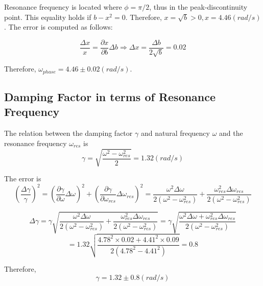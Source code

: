 Resonance frequency is located where $\phi = \pi/2$, thus in the peak-discontinuity point. This equality holds if $b-x^2=0$. Therefore, $x = \sqrt{b} > 0, x = 4.46 (rad/s)$. The error is computed as follows:

\begin{equation*}
  \frac{\Delta x}{x} = \frac{\partial x}{\partial b} \Delta b \Rightarrow \Delta x = \frac{\Delta b}{2\sqrt{b}} = 0.02
\end{equation*}

Therefore, $\omega_{phase} = 4.46 \pm 0.02 (rad/s)$.

\subsection{Damping Factor in terms of Resonance Frequency}

The relation between the damping factor $\gamma$ and natural frequency $\omega$ and the resonance frequency $\omega_{res}$ is
\begin{equation*}
  \gamma = \sqrt{\frac{\omega^2 - \omega_{res}^2}{2}} = 1.32 (rad/s)
\end{equation*}

The error is
\begin{equation*}
  \left( \frac{\Delta \gamma}{\gamma} \right)^2 = \left( \frac{\partial \gamma}{\partial \omega} \Delta \omega \right)^2 + \left( \frac{\partial \gamma}{\partial \omega_{res}} \Delta \omega_{res} \right)^2 = \frac{\omega^2 \Delta \omega}{2(\omega^2 - \omega_{res}^2)} + \frac{\omega_{res}^2\Delta \omega_{res}}{2(\omega^2 - \omega_{res}^2)}
\end{equation*}

\begin{equation*}
  \Delta \gamma = \gamma \sqrt{\frac{\omega^2 \Delta \omega}{2(\omega^2 - \omega_{res}^2)} + \frac{\omega_{res}^2\Delta \omega_{res}}{2(\omega^2 - \omega_{res}^2)}} = \gamma \sqrt{\frac{\omega^2 \Delta \omega + \omega_{res}^2 \Delta \omega_{res}}{2(\omega^2 - \omega_{res}^2)}} 
\end{equation*}
\begin{equation*}
  = 1.32 \sqrt{ \frac{4.78^2 \times 0.02 + 4.41^2 \times 0.09}{2(4.78^2 - 4.41^2)} } = 0.8
\end{equation*}

Therefore,
\begin{equation*}
  \gamma = 1.32 \pm 0.8 (rad/s) 
\end{equation*}
